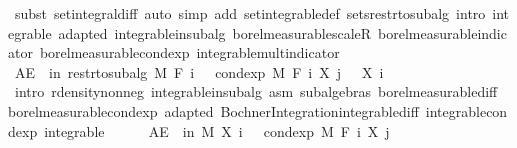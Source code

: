 \begin{isabellebody}
\ {\isacharparenleft}{\kern0pt}subst\ set{\isacharunderscore}{\kern0pt}integral{\isacharunderscore}{\kern0pt}diff{\isacharcomma}{\kern0pt}\ auto\ simp\ add{\isacharcolon}{\kern0pt}\ set{\isacharunderscore}{\kern0pt}integrable{\isacharunderscore}{\kern0pt}def\ sets{\isacharunderscore}{\kern0pt}restr{\isacharunderscore}{\kern0pt}to{\isacharunderscore}{\kern0pt}subalg\ intro{\isacharbang}{\kern0pt}{\isacharcolon}{\kern0pt}\ integrable\ adapted\ integrable{\isacharunderscore}{\kern0pt}in{\isacharunderscore}{\kern0pt}subalg\ borel{\isacharunderscore}{\kern0pt}measurable{\isacharunderscore}{\kern0pt}scaleR\ borel{\isacharunderscore}{\kern0pt}measurable{\isacharunderscore}{\kern0pt}indicator\ borel{\isacharunderscore}{\kern0pt}measurable{\isacharunderscore}{\kern0pt}cond{\isacharunderscore}{\kern0pt}exp\ integrable{\isacharunderscore}{\kern0pt}mult{\isacharunderscore}{\kern0pt}indicator{\isacharparenright}{\kern0pt}\isanewline
\ \ \ \ \isacommand{{\isacharbraceright}{\kern0pt}}\isamarkupfalse%
\isanewline
\ \ \ \ \isamarkupfalse%
\ {\isachardoublequoteopen}AE\ {\isasymxi}\ in\ restr{\isacharunderscore}{\kern0pt}to{\isacharunderscore}{\kern0pt}subalg\ M\ {\isacharparenleft}{\kern0pt}F\ i{\isacharparenright}{\kern0pt}{\isachardot}{\kern0pt}\ {}\ {\isasymle}\ cond{\isacharunderscore}{\kern0pt}exp\ M\ {\isacharparenleft}{\kern0pt}F\ i{\isacharparenright}{\kern0pt}\ {\isacharparenleft}{\kern0pt}X\ j{\isacharparenright}{\kern0pt}\ {\isasymxi}\ {\isacharminus}{\kern0pt}\ X\ i\ {\isasymxi}{\isachardoublequoteclose}\ \isanewline
\ \ \ \ \ \ \isamarkupfalse%
\ {\isacharparenleft}{\kern0pt}intro\ r{\isachardot}{\kern0pt}density{\isacharunderscore}{\kern0pt}nonneg\ integrable{\isacharunderscore}{\kern0pt}in{\isacharunderscore}{\kern0pt}subalg\ asm\ subalgebras\ borel{\isacharunderscore}{\kern0pt}measurable{\isacharunderscore}{\kern0pt}diff\ borel{\isacharunderscore}{\kern0pt}measurable{\isacharunderscore}{\kern0pt}cond{\isacharunderscore}{\kern0pt}exp\ adapted\ Bochner{\isacharunderscore}{\kern0pt}Integration{\isachardot}{\kern0pt}integrable{\isacharunderscore}{\kern0pt}diff\ integrable{\isacharunderscore}{\kern0pt}cond{\isacharunderscore}{\kern0pt}exp\ integrable{\isacharparenright}{\kern0pt}\isanewline
\ \ \ \ \isamarkupfalse%
\ {\isachardoublequoteopen}AE\ {\isasymxi}\ in\ M{\isachardot}{\kern0pt}\ X\ i\ {\isasymxi}\ {\isasymle}\ cond{\isacharunderscore}{\kern0pt}exp\ M\ {\isacharparenleft}{\kern0pt}F\ i{\isacharparenright}{\kern0pt}\ {\isacharparenleft}{\kern0pt}X\ j{\isacharparenright}{\kern0pt}\ {\isasymxi}{\isachardoublequoteclose}\ \isamarkupfalse%

\end{isabellebody}
